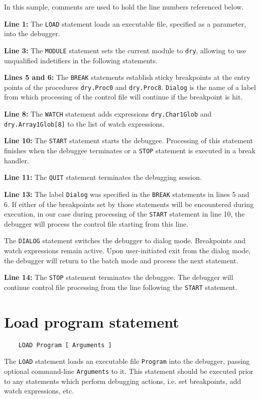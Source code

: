 In this sample, comments are used to hold the line
numbers referenced below.

{\bf Line 1:} The \verb'LOAD' statement
loads an executable file, specified as
a parameter, into the debugger.

{\bf Line 3:} The \verb'MODULE' statement sets
the current module to \verb'dry', allowing to use unqualified
indetifiers in the following statements.

{\bf Lines 5 and 6:} The \verb'BREAK' statements
establish sticky breakpoints at the entry
points of the procedures \verb'dry.Proc0' and \verb'dry.Proc8'.
\verb'Dialog' is the name of a label from which processing
of the control file will continue if the breakpoint is hit.

{\bf Line 8:} The \verb'WATCH' statement adds expressions
\verb'dry.Char1Glob' and \verb'dry.Array1Glob[8]' to the list
of watch expressions.

{\bf Line 10:} The \verb'START' statement starts the
debuggee. Processing of this statement finishes when
the debuggee terminates or a \verb'STOP' statement is
executed in a break handler.

{\bf Line 11:} The \verb'QUIT' statement terminates
the debugging session.

{\bf Line 13:} The label \verb'Dialog' was specified
in the \verb'BREAK' statements in lines 5 and 6.
If either of the breakpoints set by those statements
will be encountered during execution, in our case
during processing of the \verb'START' statement in
line 10, the debugger will process the control file
starting from this line.

The \verb'DIALOG' statement switches the debugger to
dialog mode. Breakpoints and watch expressions
remain active. Upon user-initiated exit from the
dialog mode, the debugger will return to the batch mode
and process the next statement.

{\bf Line 14:} The \verb'STOP' statement terminates
the debuggee. The debugger will continue control
file processing from the line following the \verb'START'
statement.

\section{Load program statement}

{\samepage
{}\label{batch:LOAD}
\begin{verbatim}
    LOAD Program [ Arguments ]
\end{verbatim}

The \verb'LOAD' statement loads an executable file
\verb'Program' into the debugger, passing optional
command-line \verb'Arguments' to it. This statement should
be executed prior to any statements which perform debugging
actions, i.e. set breakpoints, add watch expressions, etc.
} %

